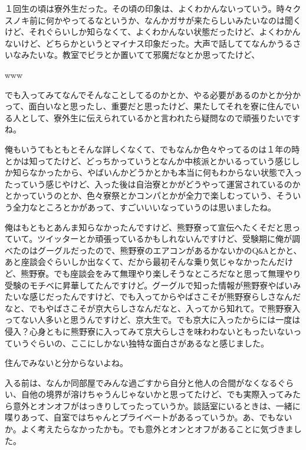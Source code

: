 \begin{multicols}{2}
  
１回生の頃は寮外生だった。その頃の印象は、よくわかんないっていう。時々クスノキ前に何かやってるなというか、なんかガサが来たらしいみたいなのは聞くけど、それぐらいしか知らなくて、よくわかんない状態だったけど、よくわかんないけど、どちらかというとマイナス印象だった。大声で話しててなんかうるさいなみたいな。教室でビラとか置いてて邪魔だなとか思ってたけど、

  
www

  
でも入ってみてなんでそんなことしてるのかとか、やる必要があるのかとか分かって、面白いなと思ったし、重要だと思ったけど、果たしてそれを寮に住んでいる人として、寮外生に伝えられているかと言われたら疑問なので頑張りたいですね。

  
俺もいうてもともとそんな詳しくなくて、でもなんか色々やってるのは１年の時とかは知ってたけど、どっちかっていうとなんか中核派とかいるっていう感じしか知らなかったから、やばいんかどうかとかも本当に何もわからない状態で入ったっていう感じやけど、入った後は自治寮とかがどうやって運営されているのかとかっていうのとか、色々寮祭とかコンパとかが全力で楽しむっていう、そういう全力なところとかがあって、すごいいいなっていうのは思いましたね。

  
俺はもともとあんま知らなかったんですけど、熊野寮って宣伝へたくそだと思っていて。ツイッターとか頑張っているかもしれないんですけど、受験期に俺が調べたのはグーグルだったので、熊野寮のエアコンがあるかないかのQ\verb|&|Aとかと、あと座談会ぐらいしか出なくて、だから最初そんな乗り気じゃなかったんだけど、熊野寮。でも座談会をみて無理やり楽しそうなところだなと思って無理やり受験のモチベに昇華してたんですけど。グーグルで知った情報が熊野寮やばいみたいな感じだったんですけど、でも入ってからやばさこそが熊野寮らしさなんだなと、でもやばさこそが京大らしさなんだなと、入ってから知れて。で熊野寮入ってない人多いと思うんですけど、京大生で。でも京大に入ったからには一度は侵入？心身ともに熊野寮に入ってみて京大らしさを味わわないともったいないっていうぐらいの、ここにしかない独特な面白さがあるなと感じました。

  
住んでみないと分からないよね。

  
入る前は、なんか同部屋でみんな過ごすから自分と他人の合間がなくなるぐらい、自他の境界が溶けちゃうんじゃないかと思ってたけど、でも実際入ってみたら意外とオンオフがはっきりしてったっていうか。談話室にいるときは、一緒に喋りあって、自室ではちゃんとプライベートがあるっていうか。あ、でもないか。よく考えたらなかったかも。でも意外とオンとオフがあることに気づきました。


\end{multicols}

